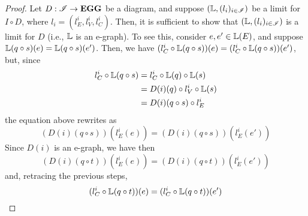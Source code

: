\begin{proof}
	Let $D: \mathscr{I} \to \mathbf{EGG}$ be a diagram, and suppose $(\mathbb{L}, (l_i)_{i \in \mathscr{I}})$ be a limit for $I \circ D$, where $l_i = (l_E^i, l_V^i, l_C^i)$. Then, it is sufficient to show that $(\mathbb{L}, (l_i)_{i \in \mathscr{I}})$ is a limit for $D$ (i.e., $\mathbb{L}$ is an e-graph). To see this, consider $e, e' \in \mathbb{L}(E)$, and suppose $\mathbb{L}(q \circ s)(e) = \mathbb{L}(q \circ s)(e')$. Then, we have $(l_C^i \circ \mathbb{L}(q \circ s))(e) = (l_C^i \circ \mathbb{L}(q \circ s))(e')$, but, since
	\[\begin{split}
		l_C^i \circ \mathbb{L}(q \circ s) &= l_C^i \circ \mathbb{L}(q) \circ \mathbb{L}(s) \\
						   &= D(i)(q) \circ l_V^i \circ \mathbb{L}(s)	\\
						   &= D(i)(q \circ s)\circ l_E^i
	\end{split}\]
	the equation above rewrites as
	\[(D(i)(q \circ s))(l_E^i (e)) = (D(i)(q \circ s))(l_E^i (e')) \]
	Since $D(i)$ is an e-graph, we have then
	\[(D(i)(q \circ t))(l_E^i (e)) = (D(i)(q \circ t))(l_E^i (e')) \]
	and, retracing the previous steps, \[ (l_C^i \circ \mathbb{L}(q \circ t))(e) = (l_C^i \circ \mathbb{L}(q \circ t))(e')\]
\end{proof}

